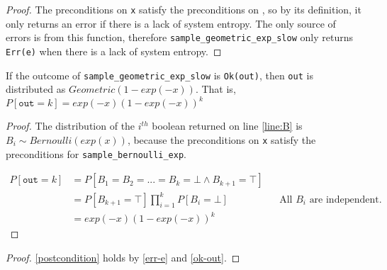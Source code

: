 \documentclass{article}
\begin{document}
\begin{proof}
    The preconditions on \texttt{x} satisfy the preconditions on ,
    so by its definition, it only returns an error if there is a lack of system entropy.
    The only source of errors is from this function,
    therefore \texttt{sample\_geometric\_exp\_slow} only returns \texttt{Err(e)} when there is a lack of system entropy.
\end{proof}

\begin{theorem} \label{ok-out} \cite{CKS20}
    If the outcome of \texttt{sample\_geometric\_exp\_slow} is \texttt{Ok(out)}, 
    then \texttt{out} is distributed as $Geometric(1 - exp(-x))$. That is, $P[\texttt{out} = k] = exp(-x) (1 - exp(-x))^{k}$ 
\end{theorem}

\begin{proof}
    The distribution of the $i^{th}$ boolean returned on line \ref{line:B} is $B_i \sim Bernoulli(exp(x))$,
    because the preconditions on \texttt{x} satisfy the preconditions for \texttt{sample\_bernoulli\_exp}.
    
    \begin{align*}
        P[\texttt{out} = k] &= P[B_1 = B_2 = ... = B_k = \bot \land B_{k + 1} = \top] \\
        &= P[B_{k + 1} = \top] \prod_{i=1}^{k} P[B_i = \bot] && \text{All $B_i$ are independent.} \\
        &= exp(-x) (1 - exp(-x))^{k}
    \end{align*}
\end{proof}

\begin{proof}
    \ref{postcondition} holds by \ref{err-e} and \ref{ok-out}.
\end{proof}




\end{document}
